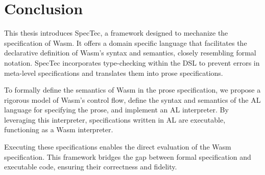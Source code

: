
\chapter{Conclusion}
\label{ch:conclusion}
\noindent


This thesis introduces SpecTec, a framework designed to mechanize the
specification of Wasm.
It offers a domain specific language that facilitates the declarative
definition of Wasm's syntax and semantics, closely resembling formal notation.
SpecTec incorporates type-checking within the DSL to prevent errors in
meta-level specifications and translates them into prose specifications.

To formally define the semantics of Wasm in the prose specification, we propose
a rigorous model of Wasm’s control flow, define the syntax and semantics of the
AL language for specifying the prose, and implement an AL interpreter.
By leveraging this interpreter, specifications written in AL are executable,
functioning as a Wasm interpreter.

Executing these specifications enables the direct evaluation of the Wasm
specification.
This framework bridges the gap between formal specification and executable
code, ensuring their correctness and fidelity.


